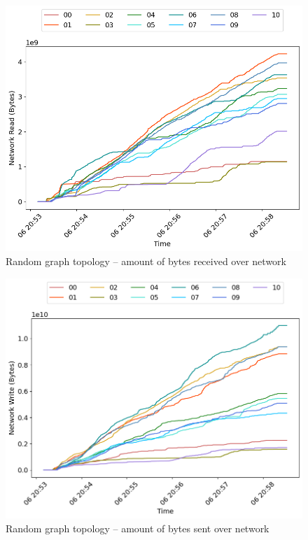 \begin{minipage}{0.5\linewidth}
\begin{figure}[H]
\captionsetup{justification=centering,width=0.8\linewidth}
\includegraphics[width=\linewidth]{figures/graph-random/net_read.png}
\caption{Random graph topology -- amount of bytes received over network}
\label{fig:graph-random-cpu_usage}
\end{figure}
\end{minipage}
\begin{minipage}{0.5\linewidth}
\begin{figure}[H]
\captionsetup{justification=centering,width=0.8\linewidth}
\includegraphics[width=\linewidth]{figures/graph-random/net_write.png}
\caption{Random graph topology -- amount of bytes sent over network}
\label{fig:graph-random-mem_usage}
\end{figure}
\end{minipage}


